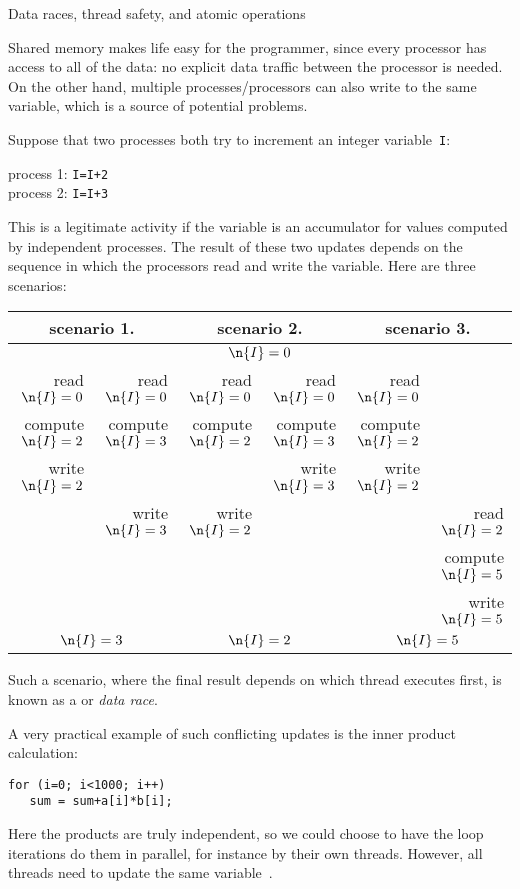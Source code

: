 
 {Data races, thread safety, and atomic operations}
\label{sec:shared-lock}

Shared memory makes life easy for the programmer, since every
processor has access to all of the data: no explicit data traffic
between the processor is needed. On the other hand, multiple
processes/processors can also write to the same variable, which is a
source of potential problems.

Suppose that two processes both try to increment an integer
variable~\texttt{I}:
\begin{tabbing}
  process 1: \texttt{I=I+2}\\
  process 2: \texttt{I=I+3}
\end{tabbing}
This is a legitimate activity if the variable is an accumulator for
values computed by independent processes.
The result of these two updates
depends on the sequence in which the processors read and
write the variable. Here are three scenarios:

\begin{tabular}{|rr|rr|rr|}
  \hline
  \multicolumn{2}{|c|}{scenario 1.}& \multicolumn{2}{|c|}{scenario 2.}&
  \multicolumn{2}{|c|}{scenario 3.}\\ \hline
  \multicolumn{6}{|c|}{$\n{I}=0$}\\ \hline
  read $\n{I}=0$&read $\n{I}=0$&
    read $\n{I}=0$&read $\n{I}=0$&
      read $\n{I}=0$& \\
  compute $\n{I}=2$&compute $\n{I}=3$& 
    compute $\n{I}=2$&compute $\n{I}=3$&
      compute $\n{I}=2$& \\
  write $\n{I}=2$& & &write $\n{I}=3$&write $\n{I}=2$& \\
  &write $\n{I}=3$&write $\n{I}=2$& & &read $\n{I}=2$\\
  &&&&&compute $\n{I}=5$\\
  &&&&&write $\n{I}=5$\\
  \hline
  \multicolumn{2}{|c|}{$\n{I}=3$}& \multicolumn{2}{|c|}{$\n{I}=2$}&
  \multicolumn{2}{|c|}{$\n{I}=5$}\\ \hline
\end{tabular}
Such a scenario, where the final result depends on which thread
executes first, is known as a  or
\emph{data race}.

A very practical example of such conflicting updates is the inner
product calculation:
\begin{verbatim}
for (i=0; i<1000; i++)
   sum = sum+a[i]*b[i];
\end{verbatim}
Here the products are truly independent, so we could choose to have
the loop iterations do them in parallel, for instance by their own
threads. However, all threads need to update the same variable~.

